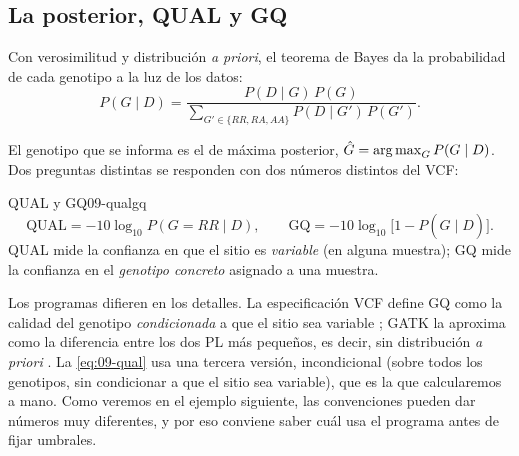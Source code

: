 \subsection{La posterior, QUAL y GQ}

Con verosimilitud y distribución \emph{a priori}, el teorema de Bayes da la probabilidad de cada genotipo a la luz de los datos:
\begin{equation}\label{eq:09-post}
P(G\mid D) = \frac{P(D\mid G)\,P(G)}{\displaystyle\sum_{G'\in\{RR,RA,AA\}} P(D\mid G')\,P(G')}.
\end{equation}

\begin{simbolos}
\end{simbolos}

El genotipo que se informa es el de máxima posterior, $\hat G=\operatorname*{arg\,max}_G P(G\mid D)$. Dos preguntas distintas se responden con dos números distintos del VCF:

\begin{definicion}{QUAL y GQ}{09-qualgq}
\begin{equation}\label{eq:09-qual}
\mathrm{QUAL} = -10\log_{10} P(G=RR \mid D),\qquad
\mathrm{GQ} = -10\log_{10}\bigl[1 - P(\hat G\mid D)\bigr].
\end{equation}
QUAL mide la confianza en que el sitio es \emph{variable} (en alguna muestra); GQ mide la confianza en el \emph{genotipo concreto} asignado a una muestra.
\end{definicion}

\begin{simbolos}
\end{simbolos}

Los programas difieren en los detalles. La especificación VCF define GQ como la calidad del genotipo \emph{condicionada} a que el sitio sea variable \parencite{c09-danecek2011}; GATK la aproxima como la diferencia entre los dos PL más pequeños, es decir, sin distribución \emph{a priori} \parencite{c09-depristo2011}. La \cref{eq:09-qual} usa una tercera versión, incondicional (sobre todos los genotipos, sin condicionar a que el sitio sea variable), que es la que calcularemos a mano. Como veremos en el ejemplo siguiente, las convenciones pueden dar números muy diferentes, y por eso conviene saber cuál usa el programa antes de fijar umbrales.

